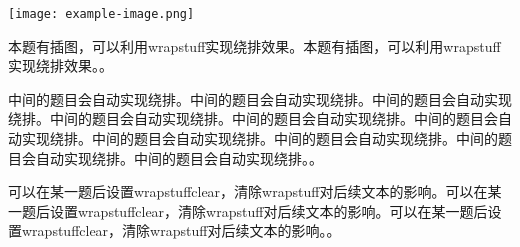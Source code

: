 \documentclass{exam-zh}
\begin{document}
\begin{question}
\end{question}


\begin{wrapstuff}[r,top=1]
  \texttt{[image: example-image.png]}
\end{wrapstuff}
\begin{question}
  本题有插图，可以利用wrapstuff实现绕排效果。本题有插图，可以利用wrapstuff实现绕排效果。\fillin[wrapstuff实现的效果较好]。
\end{question}


\begin{question}
  中间的题目会自动实现绕排。中间的题目会自动实现绕排。中间的题目会自动实现绕排。中间的题目会自动实现绕排。中间的题目会自动实现绕排。中间的题目会自动实现绕排。中间的题目会自动实现绕排。中间的题目会自动实现绕排。中间的题目会自动实现绕排。中间的题目会自动实现绕排。\fillin[中间的题目会自动实现绕排]。
\end{question}


\begin{question}
  可以在某一题后设置wrapstuffclear，清除wrapstuff对后续文本的影响。可以在某一题后设置wrapstuffclear，清除wrapstuff对后续文本的影响。可以在某一题后设置wrapstuffclear，清除wrapstuff对后续文本的影响。\fillin[wrapstuffclear清除影响]。
\end{question}
\wrapstuffclear
\end{document}
